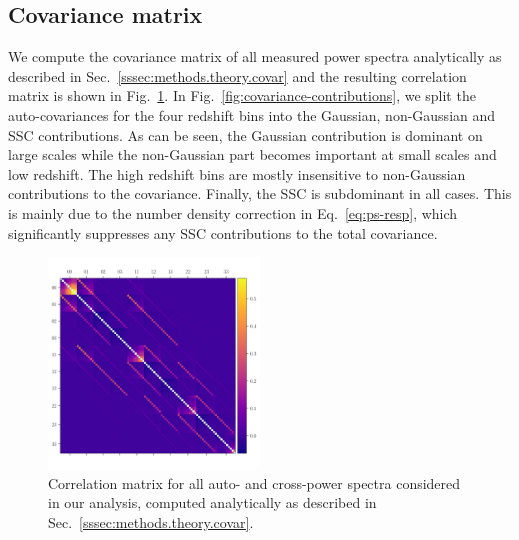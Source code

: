 \documentclass[a4paper,11pt]{article}
\begin{document}
    
  \subsection{Covariance matrix}\label{ssec:results.covariance}
    We compute the covariance matrix of all measured power spectra analytically as described in Sec.~\ref{sssec:methods.theory.covar} and the resulting correlation matrix is shown in Fig.~\ref{fig:covmat}. In Fig.~\ref{fig:covariance-contributions}, we split the auto-covariances for the four redshift bins into the Gaussian, non-Gaussian and SSC contributions. As can be seen, the Gaussian contribution is dominant on large scales while the non-Gaussian part becomes important at small scales and low redshift. The high redshift bins are mostly insensitive to non-Gaussian contributions to the covariance. Finally, the SSC is subdominant in all cases. This is mainly due to the number density correction in Eq.~\ref{eq:ps-resp}, which significantly suppresses any SSC contributions to the total covariance.
    \begin{figure}
      \begin{center}
        \includegraphics[width=0.5\textwidth]{figures/covmat_HSC_dg_hoddg_hodxdg_hoddg_hod_trisp=4h3h2h_SSC=LINBIAS-resp_l=ells_eff_all_wcross_clfit=HOD-zevol_culled=True_coadd=area_G+NG+SSC.pdf}
        \caption{Correlation matrix for all auto- and cross-power spectra considered in our analysis, computed analytically as described in Sec.~\ref{sssec:methods.theory.covar}.}\label{fig:covmat}
      \end{center}
    \end{figure}
\end{document}
